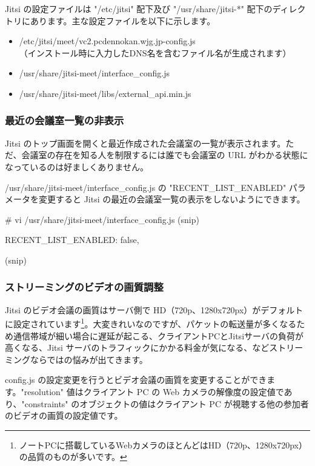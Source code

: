\documentclass[mingoth,a4paper]{jsarticle}
\begin{document}
Jitsi の設定ファイルは "/etc/jitsi" 配下及び "/usr/share/jitsi-*" 配下のディレクトリにあります。主な設定ファイルを以下に示します。

\begin{itemize}
\item /etc/jitsi/meet/vc2.pcdennokan.wjg.jp-config.js \\（インストール時に入力したDNS名を含むファイル名が生成されます）
\item /usr/share/jitsi-meet/interface\_config.js
\item /usr/share/jitsi-meet/libs/external\_api.min.js
\end{itemize}


\subsubsection{最近の会議室一覧の非表示}

Jitsi のトップ画面を開くと最近作成された会議室の一覧が表示されます。ただ、会議室の存在を知る人を制限するには誰でも会議室の URL がわかる状態になっているのは好ましくありません。

/usr/share/jitsi-meet/interface\_config.js の "RECENT\_LIST\_ENABLED" パラメータを変更すると Jitsi の最近の会議室一覧の表示をしないようにできます。

\begin{commandline}
# vi /usr/share/jitsi-meet/interface_config.js
  (snip)
  
  RECENT_LIST_ENABLED: false,

  (snip)
\end{commandline}


\subsubsection{ストリーミングのビデオの画質調整}

Jitsi のビデオ会議の画質はサーバ側で HD（720p、1280x720px）がデフォルトに設定されています\footnote{ノートPCに搭載しているWebカメラのほとんどはHD（720p、1280x720px）の品質のものが多いです。}。大変きれいなのですが、パケットの転送量が多くなるため通信帯域が細い場合に遅延が起こる、クライアントPCとJitsiサーバの負荷が高くなる、Jitsi サーバのトラフィックにかかる料金が気になる、などストリーミングならではの悩みが出てきます。

config.js の設定変更を行うとビデオ会議の画質を変更することができます。"resolution" 値はクライアント PC の Web カメラの解像度の設定値であり、"constraints" のオブジェクトの値はクライアント PC が視聴する他の参加者のビデオの画質の設定値です。
\end{document}

